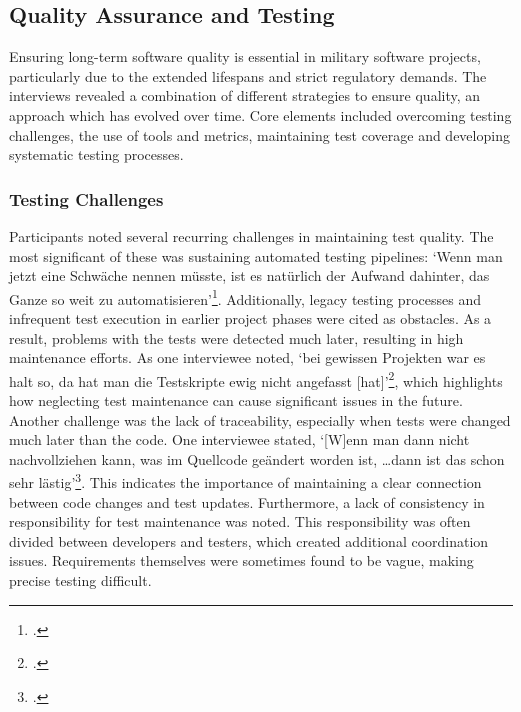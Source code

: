 \subsection{Quality Assurance and Testing}
Ensuring long-term software quality is essential in military software projects, particularly due to the extended lifespans and strict regulatory demands. The interviews revealed a combination of different strategies to ensure quality, an approach which has evolved over time.
Core elements included overcoming testing challenges, the use of tools and metrics, maintaining test coverage and developing systematic testing processes.

\subsubsection{Testing Challenges}
Participants noted several recurring challenges in maintaining test quality. The most significant of these was sustaining automated testing pipelines: `Wenn man jetzt eine Schwäche nennen müsste, ist es natürlich der Aufwand dahinter, das Ganze so weit zu automatisieren'\footcite[82]{Interview32025}.
Additionally, legacy testing processes and infrequent test execution in earlier project phases were cited as obstacles. As a result, problems with the tests were detected much later, resulting in high maintenance efforts. 
As one interviewee noted, `bei gewissen Projekten war es halt so, da hat man die Testskripte ewig nicht angefasst [hat]'\footcite[65]{Interview12025}, which highlights how neglecting test maintenance can cause significant issues in the future.
Another challenge was the lack of traceability, especially when tests were changed much later than the code. One interviewee stated, `[W]enn man dann nicht nachvollziehen kann, was im Quellcode geändert worden ist, \ldots dann ist das schon sehr lästig'\footcite[64]{Interview12025}. This indicates
the importance of maintaining a clear connection between code changes and test updates. Furthermore, a lack of consistency in responsibility for test maintenance was noted.
This responsibility was often divided between developers and testers, which created additional coordination issues.
Requirements themselves were sometimes found to be vague, making precise testing difficult.

